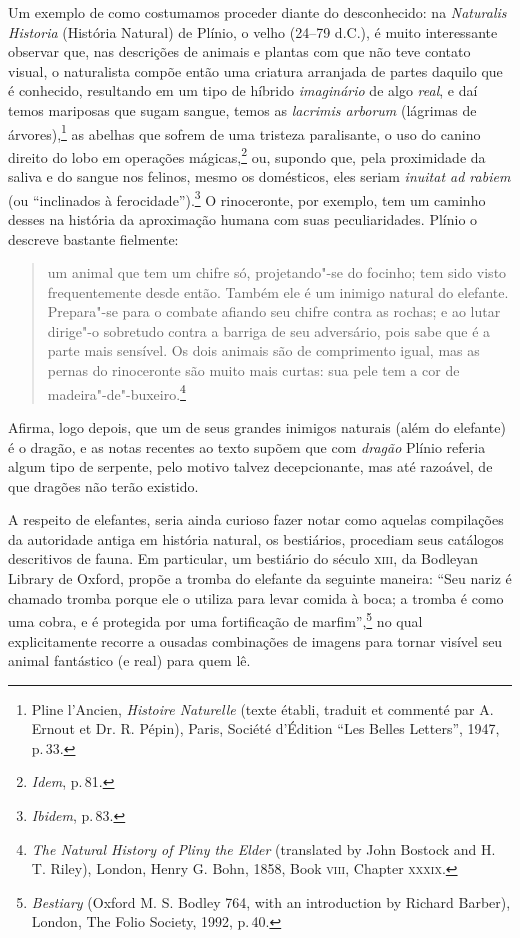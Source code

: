 Um exemplo de como costumamos proceder diante do desconhecido: na
\emph{Naturalis Historia} (História Natural) de Plínio, o velho (24--79
d.C.), é muito interessante observar que, nas descrições de animais e
plantas com que não teve contato visual, o naturalista compõe então uma
criatura arranjada de partes daquilo que é conhecido, resultando em um
tipo de híbrido \emph{imaginário} de algo \emph{real}, e daí temos
mariposas que sugam sangue, temos as \emph{lacrimis arborum} (lágrimas
de árvores),\footnote{Pline l'Ancien, \emph{Histoire Naturelle} (texte
  établi, traduit et commenté par A. Ernout et Dr. R. Pépin), Paris,
  Société d'Édition ``Les Belles Letters'', 1947, p.\,33.} as abelhas que
sofrem de uma tristeza paralisante, o uso do canino direito do lobo em
operações mágicas,\footnote{\emph{Idem}, p.\,81.} ou, supondo que, pela
proximidade da saliva e do sangue nos felinos, mesmo os domésticos, eles
seriam \emph{inuitat ad rabiem} (ou ``inclinados à
ferocidade'').\footnote{\emph{Ibidem}, p.\,83.} O rinoceronte, por
exemplo, tem um caminho desses na história da aproximação humana com
suas peculiaridades. Plínio o descreve bastante fielmente:

\begin{quote}
um animal que tem um chifre só, projetando"-se do focinho; tem sido visto
frequentemente desde então. Também ele é um inimigo natural do elefante.
Prepara"-se para o combate afiando seu chifre contra as rochas; e ao
lutar dirige"-o sobretudo contra a barriga de seu adversário, pois sabe
que é a parte mais sensível. Os dois animais são de comprimento igual,
mas as pernas do rinoceronte são muito mais curtas: sua pele tem a cor
de madeira"-de"-buxeiro.\footnote{\emph{The Natural History of Pliny the
  Elder} (translated by John Bostock and H. T. Riley), London, Henry G.
  Bohn, 1858, Book \textsc{viii}, Chapter \textsc{xxxix}.}
\end{quote}

Afirma, logo depois, que um de seus grandes inimigos naturais (além do
elefante) é o dragão, e as notas recentes ao texto supõem que com
\emph{dragão} Plínio referia algum tipo de serpente, pelo motivo talvez
decepcionante, mas até razoável, de que dragões não terão existido.

A respeito de elefantes, seria ainda curioso fazer notar como aquelas
compilações da autoridade antiga em história natural, os bestiários,
procediam seus catálogos descritivos de fauna. Em particular, um
bestiário do século \textsc{xiii}, da Bodleyan Library de Oxford, propõe a tromba
do elefante da seguinte maneira: ``Seu nariz é chamado tromba porque ele
o utiliza para levar comida à boca; a tromba é como uma cobra, e é
protegida por uma fortificação de marfim'',\footnote{\emph{Bestiary}
  (Oxford M. S. Bodley 764, with an introduction by Richard Barber),
  London, The Folio Society, 1992, p.\,40.} no qual explicitamente
recorre a ousadas combinações de imagens para tornar visível seu animal
fantástico (e real) para quem lê.


